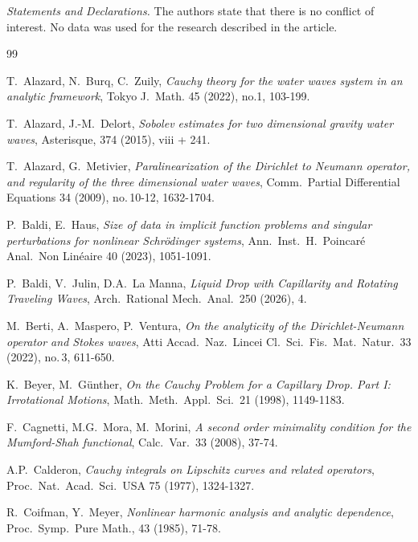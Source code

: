 \documentclass[10pt,reqno,a4paper]{article}
\numberwithin{equation}{section}
\theoremstyle{plain}
\theoremstyle{definition}
\begin{document}
\bigskip

\emph{Statements and Declarations.} 
The authors state that there is no conflict of interest. 
No data was used for the research described in the article. 



\begin{thebibliography}{99}

T.\ Alazard, N.\ Burq, C.\ Zuily, 
\emph{Cauchy theory for the water waves system in an analytic framework}, 
Tokyo J.\ Math. 45 (2022), no.1, 103-199.

T.\ Alazard, J.-M.\ Delort, 
\emph{Sobolev estimates for two dimensional gravity water waves}, 
Asterisque, 374 (2015), viii + 241.

T.\ Alazard, G.\ Metivier, 
\emph{Paralinearization of the Dirichlet to Neumann operator, 
and regularity of the three dimensional water waves}, 
Comm.\ Partial Differential Equations 34 (2009), no.\,10-12, 1632-1704.

P.\ Baldi, E.\ Haus, 
\emph{Size of data in implicit function problems 
and singular perturbations for nonlinear Schr\"odinger systems},
Ann.\ Inst.\ H.\ Poincar\'e Anal.\ Non Lin\'eaire 40 (2023), 1051-1091.

P.\ Baldi, V.\ Julin, D.A.\ La Manna, 
\emph{Liquid Drop with Capillarity and Rotating Traveling Waves}, 
Arch.\ Rational Mech.\ Anal.\ 250 (2026), 4.

M.\ Berti, A.\ Maspero, P.\ Ventura,
\emph{On the analyticity of the Dirichlet-Neumann operator and Stokes waves}, 
Atti Accad.\ Naz.\ Lincei Cl.\ Sci.\ Fis.\ Mat.\ Natur.\ 33 (2022), no.\,3, 611-650.

K.\ Beyer, M.\ G\"unther,
\emph{On the Cauchy Problem for a Capillary Drop. Part I: Irrotational Motions},
Math.\ Meth.\ Appl.\ Sci.\ 21 (1998), 1149-1183.

F.\ Cagnetti, M.G.\ Mora, M.\ Morini, 
\emph{A second order minimality condition for the Mumford-Shah functional},  
Calc.\ Var.\ 33 (2008), 37-74.

A.P.\ Calderon, 
\emph{Cauchy integrals on Lipschitz curves and related operators},
Proc.\ Nat.\ Acad.\ Sci.\ USA 75 (1977), 1324-1327.

R.\ Coifman, Y.\ Meyer, 
\emph{Nonlinear harmonic analysis and analytic dependence}, 
Proc.\ Symp.\ Pure Math., 43 (1985), 71-78.


\end{thebibliography}
\end{document}
